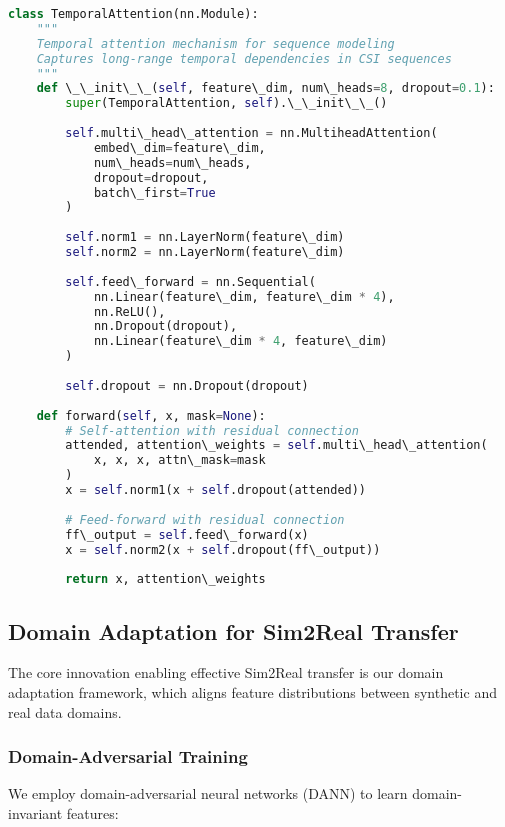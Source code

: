 \documentclass[journal]{IEEEtran}
\begin{document}
\begin{lstlisting}[language=Python, caption=Temporal Attention Implementation]
class TemporalAttention(nn.Module):
    """
    Temporal attention mechanism for sequence modeling
    Captures long-range temporal dependencies in CSI sequences
    """
    def \_\_init\_\_(self, feature\_dim, num\_heads=8, dropout=0.1):
        super(TemporalAttention, self).\_\_init\_\_()
        
        self.multi\_head\_attention = nn.MultiheadAttention(
            embed\_dim=feature\_dim,
            num\_heads=num\_heads,
            dropout=dropout,
            batch\_first=True
        )
        
        self.norm1 = nn.LayerNorm(feature\_dim)
        self.norm2 = nn.LayerNorm(feature\_dim)
        
        self.feed\_forward = nn.Sequential(
            nn.Linear(feature\_dim, feature\_dim * 4),
            nn.ReLU(),
            nn.Dropout(dropout),
            nn.Linear(feature\_dim * 4, feature\_dim)
        )
        
        self.dropout = nn.Dropout(dropout)
        
    def forward(self, x, mask=None):
        # Self-attention with residual connection
        attended, attention\_weights = self.multi\_head\_attention(
            x, x, x, attn\_mask=mask
        )
        x = self.norm1(x + self.dropout(attended))
        
        # Feed-forward with residual connection
        ff\_output = self.feed\_forward(x)
        x = self.norm2(x + self.dropout(ff\_output))
        
        return x, attention\_weights
\end{lstlisting}

\subsection{Domain Adaptation for Sim2Real Transfer}

The core innovation enabling effective Sim2Real transfer is our domain adaptation framework, which aligns feature distributions between synthetic and real data domains.

\subsubsection{Domain-Adversarial Training}

We employ domain-adversarial neural networks (DANN) to learn domain-invariant features:
\end{document}
